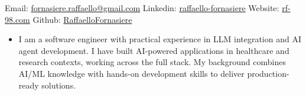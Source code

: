 \documentclass[a4paper,9pt]{article}
\newcommand{\cvsection}[2]{
    \vspace{0.3cm} %
    \noindent {\large \textbf{#1}} %
    \begin{itemize}
        \renewcommand{\labelitemi}{}
        \small #2 %
    \end{itemize}
}
\begin{document}

\vspace{0.2cm}
\noindent
\begin{minipage}{\linewidth}
    \begin{center}
        Email: \href{mailto:fornasiere.raffaello@gmail.com}{fornasiere.raffaello@gmail.com} \hfill
        Linkedin: \href{https://linkedin.com/in/raffaello-fornasiere}{raffaello-fornasiere} \hfill
        Website: \href{https://rf-98.com}{rf-98.com}\hfill
        Github: \href{https://github.com/RaffaelloFornasiere}{RaffaelloFornasiere}\hfill
    \end{center}
\end{minipage}

\cvsection{Summary}{
    \item I am a software engineer with practical experience in LLM integration and AI agent development. I have built AI-powered applications in healthcare and research contexts, working across the full stack. My background combines AI/ML knowledge with hands-on development skills to deliver production-ready solutions.
}
\end{document}
